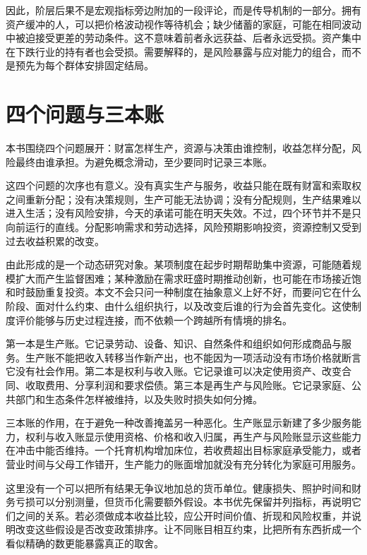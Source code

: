 \documentclass[UTF8,fontset=fandol,zihao=-4,oneside,openany]{ctexbook}
\begin{document}
因此，阶层后果不是宏观指标旁边附加的一段评论，而是传导机制的一部分。拥有资产缓冲的人，可以把价格波动视作等待机会；缺少储蓄的家庭，可能在相同波动中被迫接受更差的劳动条件。这不意味着前者永远获益、后者永远受损。资产集中在下跌行业的持有者也会受损。需要解释的，是风险暴露与应对能力的组合，而不是预先为每个群体安排固定结局。

\section{四个问题与三本账}
本书围绕四个问题展开：财富怎样生产，资源与决策由谁控制，收益怎样分配，风险最终由谁承担。为避免概念滑动，至少要同时记录三本账。

\label{arg:P008}
这四个问题的次序也有意义。没有真实生产与服务，收益只能在既有财富和索取权之间重新分配；没有决策规则，生产可能无法协调；没有分配规则，生产结果难以进入生活；没有风险安排，今天的承诺可能在明天失效。不过，四个环节并不是只向前运行的直线。分配影响需求和劳动选择，风险预期影响投资，资源控制又受到过去收益积累的改变。

由此形成的是一个动态研究对象。某项制度在起步时期帮助集中资源，可能随着规模扩大而产生监督困难；某种激励在需求旺盛时期推动创新，也可能在市场接近饱和时鼓励重复投资。本文不会只问一种制度在抽象意义上好不好，而要问它在什么阶段、面对什么约束、由什么组织执行，以及改变后谁的行为会首先变化。这使制度评价能够与历史过程连接，而不依赖一个跨越所有情境的排名。

第一本是生产账。它记录劳动、设备、知识、自然条件和组织如何形成商品与服务。生产账不能把收入转移当作新产出，也不能因为一项活动没有市场价格就断言它没有社会作用。第二本是权利与收入账。它记录谁可以决定使用资产、改变合同、收取费用、分享利润和要求偿债。第三本是再生产与风险账。它记录家庭、公共部门和生态条件怎样被维持，以及失败时损失如何分摊。

\label{arg:P009}
三本账的作用，在于避免一种改善掩盖另一种恶化。生产账显示新建了多少服务能力，权利与收入账显示使用资格、价格和收入归属，再生产与风险账显示这些能力在冲击中能否维持。一个托育机构增加床位，若收费超出目标家庭承受能力，或者营业时间与父母工作错开，生产能力的账面增加就没有充分转化为家庭可用服务。

这里没有一个可以把所有结果无争议地加总的货币单位。健康损失、照护时间和财务亏损可以分别测量，但货币化需要额外假设。本书优先保留并列指标，再说明它们之间的关系。若必须做成本收益比较，应公开时间价值、折现和风险权重，并说明改变这些假设是否改变政策排序。让不同账目相互约束，比把所有东西折成一个看似精确的数更能暴露真正的取舍。
\end{document}
